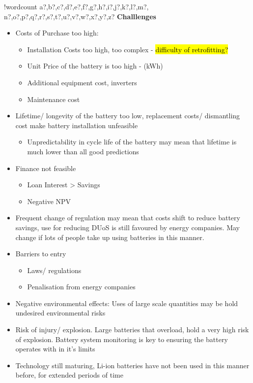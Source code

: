 \documentclass[fontsize=9.5pt]{extarticle}
\numberwithin{figure}{section} %
\providecommand{\tightlist}{%
  \setlength{\itemsep}{0pt}\setlength{\parskip}{0pt}}
\newcounter{words}
\newenvironment{counted}{%
  \setcounter{words}{0}
  \SearchList!{wordcount}{\stepcounter{words}}
    {a?,b?,c?,d?,e?,f?,g?,h?,i?,j?,k?,l?,m?,
    n?,o?,p?,q?,r?,s?,t?,u?,v?,w?,x?,y?,z?}
  \UndoBoundary{'}
  \SearchOrder{p;}}{%
  \StopSearching}
\begin{document}
\begin{counted}
\textbf{Challlenges}

\begin{itemize}
\tightlist
\item
  Costs of Purchase too high:

  \begin{itemize}
  \tightlist
  \item
    Installation Costs too high, too complex -
    \hl{difficulty of retrofitting?}
  \item
    Unit Price of the battery is too high - (kWh)
  \item
    Additional equipment cost, inverters
  \item
    Maintenance cost
  \end{itemize}
\item
  Lifetime/ longevity of the battery too low, replacement costs/
  dismantling cost make battery installation unfeasible

  \begin{itemize}
  \tightlist
  \item
    Unpredictability in cycle life of the battery may mean that lifetime
    is much lower than all good predictions
  \end{itemize}
\item
  Finance not feasible

  \begin{itemize}
  \tightlist
  \item
    Loan Interest \textgreater{} Savings
  \item
    Negative NPV
  \end{itemize}
\item
  Frequent change of regulation may mean that costs shift to reduce
  battery savings, use for reducing DUoS is still favoured by energy
  companies. May change if lots of people take up using batteries in
  this manner.
\item
  Barriers to entry

  \begin{itemize}
  \tightlist
  \item
    Laws/ regulations
  \item
    Penalisation from energy companies
  \end{itemize}
\item
  Negative environmental effects: Uses of large scale quantities may be
  hold undesired environmental risks
\item
  Risk of injury/ explosion. Large batteries that overload, hold a very
  high risk of explosion. Battery system monitoring is key to ensuring
  the battery operates with in it's limits
\item
  Technology still maturing, Li-ion batteries have not been used in this
  manner before, for extended periods of time
\end{itemize}


\end{counted}
\end{document}

